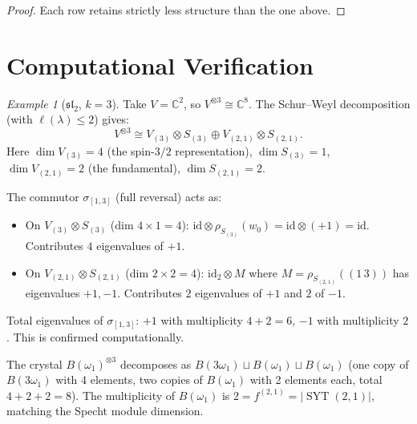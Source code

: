 \documentclass[11pt]{article}
\theoremstyle{remark}
\newtheorem{example}[theorem]{Example}
\newcommand{\CC}{\mathbb{C}}
\newcommand{\id}{\mathrm{id}}
\DeclareMathOperator{\SYT}{SYT}
\begin{document}
\begin{proof}
Each row retains strictly less structure than the one above.
\end{proof}

\section{Computational Verification}

\begin{example}[$\mathfrak{sl}_2$, $k = 3$]\label{ex:sl2k3}
Take $V = \CC^2$, so $V^{\otimes 3} \cong \CC^8$. The Schur--Weyl
decomposition (with $\ell(\lambda) \leq 2$) gives:
\[
  V^{\otimes 3} \cong V_{(3)} \otimes S_{(3)}
  \oplus V_{(2,1)} \otimes S_{(2,1)}.
\]
Here $\dim V_{(3)} = 4$ (the spin-$3/2$ representation),
$\dim S_{(3)} = 1$, $\dim V_{(2,1)} = 2$ (the fundamental),
$\dim S_{(2,1)} = 2$.

The commutor $\sigma_{[1,3]}$ (full reversal) acts as:
\begin{itemize}
  \item On $V_{(3)} \otimes S_{(3)}$ (dim $4 \times 1 = 4$):
    $\id \otimes \rho_{S_{(3)}}(w_0) = \id \otimes (+1) = \id$.
    Contributes $4$ eigenvalues of $+1$.
  \item On $V_{(2,1)} \otimes S_{(2,1)}$ (dim $2 \times 2 = 4$):
    $\id_2 \otimes M$ where $M = \rho_{S_{(2,1)}}((1\,3))$ has eigenvalues
    $+1, -1$. Contributes $2$ eigenvalues of $+1$ and $2$ of $-1$.
\end{itemize}

Total eigenvalues of $\sigma_{[1,3]}$: $+1$ with multiplicity $4 + 2 = 6$,
$-1$ with multiplicity $2$. This is confirmed computationally.

The crystal $B(\omega_1)^{\otimes 3}$ decomposes as
$B(3\omega_1) \sqcup B(\omega_1) \sqcup B(\omega_1)$
(one copy of $B(3\omega_1)$ with 4 elements, two copies of $B(\omega_1)$
with 2 elements each, total $4 + 2 + 2 = 8$). The multiplicity of
$B(\omega_1)$ is $2 = f^{(2,1)} = |\SYT(2,1)|$, matching the Specht
module dimension.
\end{example}
\end{document}
